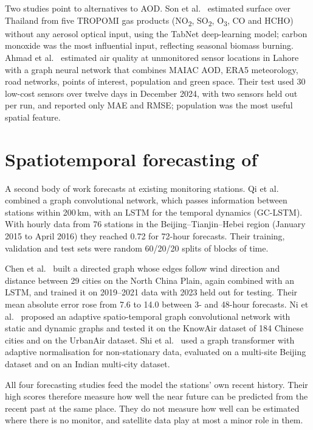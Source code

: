 Two studies point to alternatives to AOD. Son et al.\ \cite{son2023tropomi} estimated surface
\pmtf{} over Thailand from five TROPOMI gas products (NO\textsubscript{2}, SO\textsubscript{2},
O\textsubscript{3}, CO and HCHO) without any aerosol optical input, using the TabNet deep-learning
model; carbon monoxide was the most influential input, reflecting seasonal biomass burning.
Ahmad et al.\ \cite{ahmad2025lahore} estimated air quality at unmonitored sensor locations in Lahore
with a graph neural network that combines MAIAC AOD, ERA5 meteorology, road networks, points of
interest, population and green space. Their test used 30 low-cost sensors over twelve days in
December 2024, with two sensors held out per run, and reported only MAE and RMSE; population was the
most useful spatial feature.

\section{Spatiotemporal forecasting of \texorpdfstring{\pmtf{}}{PM2.5}}

A second body of work forecasts \pmtf{} at existing monitoring stations. Qi et al.\
\cite{qi2019gclstm} combined a graph convolutional network, which passes information between
stations within 200\,km, with an LSTM for the temporal dynamics (GC-LSTM). With hourly data from 76
stations in the Beijing--Tianjin--Hebei region (January 2015 to April 2016) they reached \rsq{} 0.72
for 72-hour forecasts. Their training, validation and test sets were random 60/20/20 splits of
blocks of time.

Chen et al.\ \cite{chen2025hybrid} built a directed graph whose edges follow wind direction and
distance between 29 cities on the North China Plain, again combined with an LSTM, and trained it on
2019--2021 data with 2023 held out for testing. Their mean absolute error rose from 7.6 to
14.0\ugm{} between 3- and 48-hour forecasts. Ni et al.\ \cite{ni2023asgcn} proposed an adaptive
spatio-temporal graph convolutional network with static and dynamic graphs and tested it on the
KnowAir dataset of 184 Chinese cities and on the UrbanAir dataset. Shi et al.\ \cite{shi2026astgt}
used a graph transformer with adaptive normalisation for non-stationary data, evaluated on a
multi-site Beijing dataset and on an Indian multi-city dataset.

All four forecasting studies feed the model the stations' own recent \pmtf{} history. Their high
scores therefore measure how well the near future can be predicted from the recent past at the
same place. They do not measure how well \pmtf{} can be estimated where there is no monitor, and
satellite data play at most a minor role in them.


